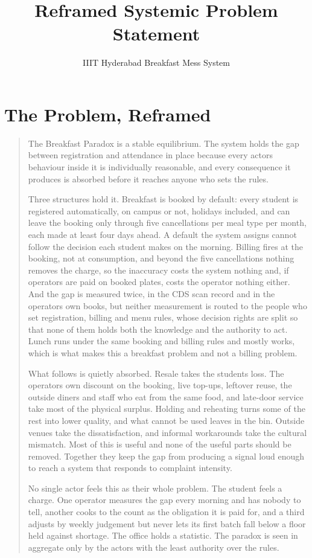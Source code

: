 \documentclass[
  10pt,
  table]{article}
\title{Reframed Systemic Problem Statement}
\subtitle{IIIT Hyderabad Breakfast Mess System}
\author{}
\date{}
\makeatletter
\gdef\psubtitle{}
\renewcommand{\maketitle}{%
  \begingroup\raggedright
  {\color{pblue}\fontsize{24}{27}\selectfont\bfseries \@title\par}
  \vspace{3pt}{\color{pblue}\rule{\linewidth}{2.4pt}}\par\vspace{5pt}
  {\color{pslate}\large \psubtitle\par}
  \vspace{4pt}
  \endgroup}
\makeatother
\begin{document}
\maketitle

\renewcommand*\contentsname{Contents}
{
\hypersetup{linkcolor=pslate}
\setcounter{tocdepth}{2}
\tableofcontents
}
\section{The Problem, Reframed}\label{the-problem-reframed}

\begin{quote}
The Breakfast Paradox is a stable equilibrium. The system holds the gap between registration and attendance in place because every actor\textquotesingle s behaviour inside it is individually reasonable, and every consequence it produces is absorbed before it reaches anyone who sets the rules.

Three structures hold it. Breakfast is booked by default: every student is registered automatically, on campus or not, holidays included, and can leave the booking only through five cancellations per meal type per month, each made at least four days ahead. A default the system assigns cannot follow the decision each student makes on the morning. Billing fires at the booking, not at consumption, and beyond the five cancellations nothing removes the charge, so the inaccuracy costs the system nothing and, if operators are paid on booked plates, costs the operator nothing either. And the gap is measured twice, in the CDS scan record and in the operators\textquotesingle{} own books, but neither measurement is routed to the people who set registration, billing and menu rules, whose decision rights are split so that none of them holds both the knowledge and the authority to act. Lunch runs under the same booking and billing rules and mostly works, which is what makes this a breakfast problem and not a billing problem.

What follows is quietly absorbed. Resale takes the student\textquotesingle s loss. The operator\textquotesingle s own discount on the booking, live top-ups, leftover reuse, the outside diners and staff who eat from the same food, and late-door service take most of the physical surplus. Holding and reheating turns some of the rest into lower quality, and what cannot be used leaves in the bin. Outside venues take the dissatisfaction, and informal workarounds take the cultural mismatch. Most of this is useful and none of the useful parts should be removed. Together they keep the gap from producing a signal loud enough to reach a system that responds to complaint intensity.

No single actor feels this as their whole problem. The student feels a charge. One operator measures the gap every morning and has nobody to tell, another cooks to the count as the obligation it is paid for, and a third adjusts by weekly judgement but never lets its first batch fall below a floor held against shortage. The office holds a statistic. The paradox is seen in aggregate only by the actors with the least authority over the rules.
\end{quote}
\end{document}
